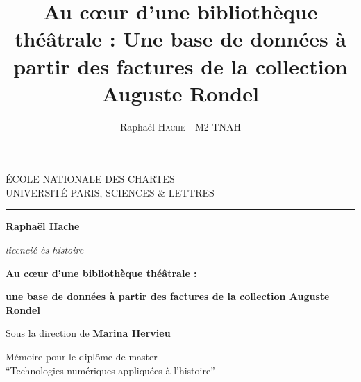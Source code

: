 \documentclass[12pt,twoside]{book}
\author{Raphaël \textsc{Hache} - M2 TNAH}
\title{Au cœur d'une bibliothèque théâtrale : Une base de données à partir des factures de la collection Auguste Rondel}
\begin{document}
	\begin{titlepage}
		\begin{center}
			
			\bigskip
			
			\begin{large}				
				ÉCOLE NATIONALE DES CHARTES\\
				UNIVERSITÉ PARIS, SCIENCES \& LETTRES
			\end{large}
			\begin{center}\rule{2cm}{0.02cm}\end{center}
			
			\bigskip
			\bigskip
			\bigskip
			\begin{Large}
				\textbf{Raphaël Hache}\\
			\end{Large}
			\begin{normalsize} \textit{licencié ès histoire}\\
			\end{normalsize}
			
			\bigskip
			\bigskip
			\bigskip
			
			\begin{Huge}
				\textbf{Au cœur d'une bibliothèque théâtrale : }\\
			\end{Huge}
			\bigskip
			\bigskip
			\begin{LARGE}
				\textbf{une base de données à partir des factures de la collection Auguste Rondel}\\
			\end{LARGE}
			
			\bigskip
			\bigskip
			\bigskip
			\begin{large}
				Sous la direction de \textbf{Marina Hervieu}
			\end{large}
			\vfill
			
			\begin{large}
				Mémoire 
				pour le diplôme de master \\
				\enquote{Technologies numériques appliquées à l'histoire} \\
			\end{large}
			
		\end{center}
	\end{titlepage}

	\thispagestyle{empty}	
	\cleardoublepage
	
\frontmatter
\end{document}
